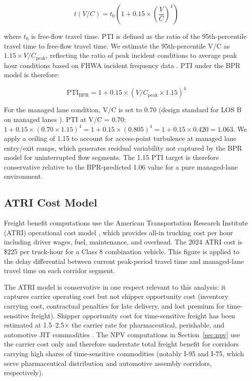 \begin{equation}
t(V/C) = t_0 \left(1 + 0.15 \times \left(\frac{V}{C}\right)^4\right)
\label{eq:bpr}
\end{equation}

where $t_0$ is free-flow travel time. PTI is defined as the ratio of the 95th-percentile travel time to free-flow travel time. We estimate the 95th-percentile V/C as $1.15 \times V/C_{\text{peak}}$, reflecting the ratio of peak incident conditions to average peak hour conditions based on FHWA incident frequency data \citep{FHWA_freight2023}. PTI under the BPR model is therefore:

\begin{equation}
\text{PTI}_{\text{BPR}} = 1 + 0.15 \times \left(V/C_{\text{peak}} \times 1.15\right)^4
\label{eq:pti}
\end{equation}

For the managed lane condition, V/C is set to 0.70 (design standard for LOS B on managed lanes \citep{FHWA_ML2021}). PTI at V/C = 0.70: $1 + 0.15 \times (0.70 \times 1.15)^4 = 1 + 0.15 \times (0.805)^4 = 1 + 0.15 \times 0.420 = 1.063$. We apply a ceiling of 1.15 to account for access-point turbulence at managed lane entry/exit ramps, which generates residual variability not captured by the BPR model for uninterrupted flow segments. The 1.15 PTI target is therefore conservative relative to the BPR-predicted 1.06 value for a pure managed-lane environment.

\subsection{ATRI Cost Model}

Freight benefit computations use the American Transportation Research Institute (ATRI) operational cost model \citep{ATRI_costs2024}, which provides all-in trucking cost per hour including driver wages, fuel, maintenance, and overhead. The 2024 ATRI cost is \$225 per truck-hour for a Class 8 combination vehicle. This figure is applied to the delay differential between current peak-period travel time and managed-lane travel time on each corridor segment.

The ATRI model is conservative in one respect relevant to this analysis: it captures carrier operating cost but not shipper opportunity cost (inventory carrying cost, contractual penalties for late delivery, and lost premium for time-sensitive freight). Shipper opportunity cost for time-sensitive freight has been estimated at 1.5--2.5$\times$ the carrier rate for pharmaceutical, perishable, and automotive JIT commodities \citep{ATRI_costs2024}. The NPV computations in Section~\ref{sec:npv} use the carrier cost only and therefore understate total freight benefit for corridors carrying high shares of time-sensitive commodities (notably I-95 and I-75, which serve pharmaceutical distribution and automotive assembly corridors, respectively).

